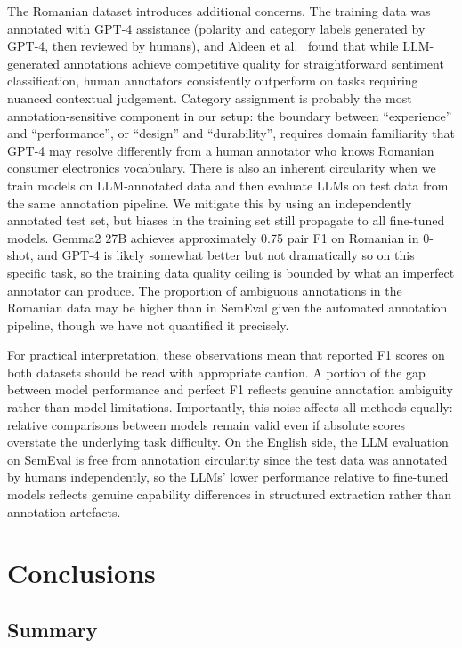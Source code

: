 \documentclass[12pt,a4paper]{report}
\begin{document}
The Romanian dataset introduces additional concerns. The training data was annotated with GPT-4 assistance (polarity and category labels generated by GPT-4, then reviewed by humans), and Aldeen et al.~\cite{aldeen2023chatgpt} found that while LLM-generated annotations achieve competitive quality for straightforward sentiment classification, human annotators consistently outperform on tasks requiring nuanced contextual judgement. Category assignment is probably the most annotation-sensitive component in our setup: the boundary between ``experience'' and ``performance'', or ``design'' and ``durability'', requires domain familiarity that GPT-4 may resolve differently from a human annotator who knows Romanian consumer electronics vocabulary. There is also an inherent circularity when we train models on LLM-annotated data and then evaluate LLMs on test data from the same annotation pipeline. We mitigate this by using an independently annotated test set, but biases in the training set still propagate to all fine-tuned models. Gemma2 27B achieves approximately 0.75 pair F1 on Romanian in 0-shot, and GPT-4 is likely somewhat better but not dramatically so on this specific task, so the training data quality ceiling is bounded by what an imperfect annotator can produce. The proportion of ambiguous annotations in the Romanian data may be higher than in SemEval given the automated annotation pipeline, though we have not quantified it precisely.

For practical interpretation, these observations mean that reported F1 scores on both datasets should be read with appropriate caution. A portion of the gap between model performance and perfect F1 reflects genuine annotation ambiguity rather than model limitations. Importantly, this noise affects all methods equally: relative comparisons between models remain valid even if absolute scores overstate the underlying task difficulty. On the English side, the LLM evaluation on SemEval is free from annotation circularity since the test data was annotated by humans independently, so the LLMs' lower performance relative to fine-tuned models reflects genuine capability differences in structured extraction rather than annotation artefacts.



\chapter{Conclusions}\label{ch:conclusions}

\section{Summary}
\end{document}
